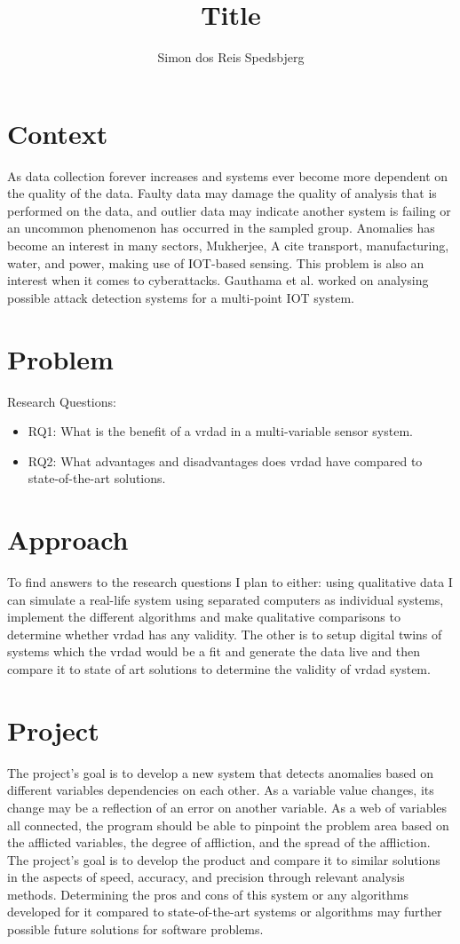 \documentclass[a4paper,8pt]{article}
\title{Title}
\author{Simon dos Reis Spedsbjerg}
\begin{document}
	\maketitle
	\section{Context}
		As data collection forever increases and systems ever become more dependent on the quality of the data. Faulty data may damage the quality of analysis that is performed on the data, and outlier data may indicate another system is failing or an uncommon phenomenon has occurred in the sampled group. Anomalies has become an interest in many sectors, Mukherjee, A\cite{MUKHERJEE2024102444} cite transport, manufacturing, water, and power, making use of IOT-based sensing. This problem is also an interest when it comes to cyberattacks. Gauthama et al. worked on analysing possible attack detection systems for a multi-point IOT system\cite{MR2022103046}.
			
	\section{Problem}
		Research Questions:
		\begin{itemize}
			\item RQ1: What is the benefit of a \gls{vrdad} in a multi-variable sensor system. 
			\item RQ2: What advantages and disadvantages does \gls{vrdad} have compared to state-of-the-art solutions.
		\end{itemize}
	
	\section{Approach}
		To find answers to the research questions I plan to either: using qualitative data I can simulate a real-life system using separated computers as individual systems, implement the different algorithms and make qualitative comparisons to determine whether \gls{vrdad} has any validity. The other is to setup digital twins of systems which the \gls{vrdad} would be a fit and generate the data live and then compare it to state of art solutions to determine the validity of \gls{vrdad} system.
		
	\section{Project}
		The project's goal is to develop a new system that detects anomalies based on different variables dependencies on each other. As a variable value changes, its change may be a reflection of an error on another variable. As a web of variables all connected, the program should be able to pinpoint the problem area based on the afflicted variables, the degree of affliction, and the spread of the affliction. The project's goal is to develop the product and compare it to similar solutions in the aspects of speed, accuracy, and precision through relevant analysis methods. Determining the pros and cons of this system or any algorithms developed for it compared to state-of-the-art systems or algorithms may further possible future solutions for software problems.
	
\end{document}
